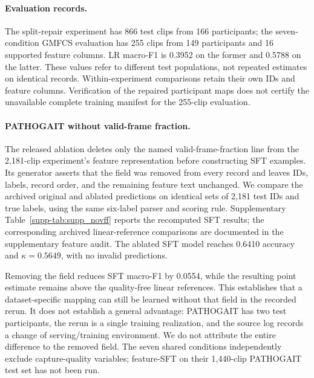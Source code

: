 \paragraph{Evaluation records.}
The split-repair experiment has 866 test clips from 166 participants; the seven-condition GMFCS evaluation has 255 clips from 149 participants and 16 supported feature columns. LR macro-F1 is 0.3952 on the former and 0.5788 on the latter. These values refer to different test populations, not repeated estimates on identical records. Within-experiment comparisons retain their own IDs and feature columns. Verification of the repaired participant maps does not certify the unavailable complete training manifest for the 255-clip evaluation.

\paragraph{PATHOGAIT without valid-frame fraction.}
The released ablation deletes only the named valid-frame-fraction line from the 2,181-clip experiment's feature representation before constructing SFT examples. Its generator asserts that the field was removed from every record and leaves IDs, labels, record order, and the remaining feature text unchanged. We compare the archived original and ablated predictions on identical sets of 2,181 test IDs and true labels, using the same six-label parser and scoring rule. Supplementary Table~\ref{supp-tab:supp_novff} reports the recomputed SFT results; the corresponding archived linear-reference comparisons are documented in the supplementary feature audit. The ablated SFT model reaches 0.6410 accuracy and $\kappa=0.5649$, with no invalid predictions.

Removing the field reduces SFT macro-F1 by 0.0554, while the resulting point estimate remains above the quality-free linear references. This establishes that a dataset-specific mapping can still be learned without that field in the recorded rerun. It does not establish a general advantage: PATHOGAIT has two test participants, the rerun is a single training realization, and the source log records a change of serving/training environment. We do not attribute the entire difference to the removed field. The seven shared conditions independently exclude capture-quality variables; feature-SFT on their 1,440-clip PATHOGAIT test set has not been run.
